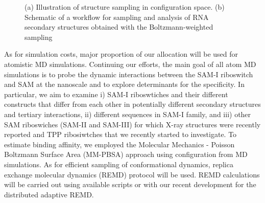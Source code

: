 \documentclass[a4paper,10pt]{article}
\begin{document}
\begin{figure}
\begin{center}
\end{center}
\caption{(a) Illustration of structure sampling in configuration space.  (b) Schematic of a workflow for sampling and analysis of RNA secondary structures obtained with the Boltzmann-weighted sampling}
\label{fig:folding energy landscape}
\end{figure}

As for simulation costs, major proportion of our allocation will be used for atomistic MD simulations.  Continuing our efforts, the main goal of all atom MD simulations is to probe the dynamic interactions between the SAM-I riboswitch and SAM at the nanoscale and to explore determinants for the specificity. In particular, we aim to examine i) SAM-I riboswtiches and their different constructs that differ from each other in potentially different secondary structures and tertiary interactions, ii) different sequences in SAM-I family, and iii) other SAM riboswiches (SAM-II and SAM-III) for which X-ray structures were recently reported and TPP ribosiwtches that we recently started to investigate.  To estimate binding affinity, we employed the Molecular Mechanics - Poisson Boltzmann Surface Area (MM-PBSA) approach using configuration from MD simulations.  As for efficient sampling of conformational dynamics, replica exchange molecular dynamics (REMD) protocol will be used.  REMD calculations will be carried out using available scripts or with our recent development for the distributed adaptive REMD.  
\end{document}
